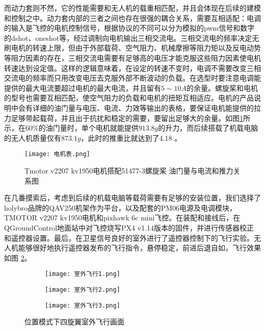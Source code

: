 而动力套则不然，它的性能需要和无人机的载重相匹配，并且会体现在后续的建模和控制之中。动力套内部的三者之间也存在很强的耦合关系，需要互相适配：电调的输入是飞控的电机控制信号，根据协议的不同可以分为模拟的pwm信号和数字的dshot、oneshot等，经过调制向电机输出三相交流电。三相交流电的频率决定无刷电机的转速上限，但由于外部载荷、空气阻力、机械摩擦等阻力矩以及反电动势等阻力因素的存在，三相交流电需要有足够高的电压才能克服这些阻力因素使电机转速达到设定值。这样的逻辑意味着，在设定的转速不变时，电调不需要改变三相交流电的频率而只用改变电压去克服外部不断波动的负载。在选型时要注意电调能提供的最大电流要超过电机的最大电流，并且留有$5\sim 10A$的余量。螺旋桨和电机的型号也需要互相匹配，使空气阻力的负载和电机的扭矩互相适应。电机的产品说明中会有详细的油门量与电压、电流、力效等输出的表格，要保证电机能提供的拉力足够带起载荷，并且出于抗扰和稳定的需要，要留出足够大的余量。如图\ref{电机表}所示，在$60 \%$的油门量时，单个电机就能提供$913.8g$的升力，而后续搭载了机载电脑的无人机质量仅有$873.1g$，此时的推重比就达到了4.18 。
\begin{figure}[!h]
  \centering
  \texttt{[image: 电机表.png]}
  \caption{Tmotor v2207 kv1950电机搭配51477-3螺旋桨 油门量与电流和推力关系图 \cite{Tmotor2023}}
  \label{电机表}
\end{figure}

在几番摸索后，考虑到后续的机载电脑等载荷需要有足够的安装位置，我们选择了holybro品牌的QAV250机架作为平台，以及配套的PM06电源及电调模块，TMOTOR v2207 kv1950电机和pixhawk 6c mini飞控。在装配和接线后，在QGroundControl地面站中对飞控烧写PX4 v1.14版本的固件，并进行传感器校正和遥控器设置。最后，在卫星信号良好的室外进行了遥控器控制下的飞行实验。无人机能够很好地执行遥控器发布的飞行指令，悬停稳定，前进后退自如，飞行效果如图 \ref{室外飞行}。
\begin{figure}[!h]
  \centering
  \begin{subfigure}[c]{0.33\textwidth}
    \centering
    \texttt{[image: 室外飞行1.png]}
  \end{subfigure} \hfill
  \begin{subfigure}[c]{0.33\textwidth}
    \centering
    \texttt{[image: 室外飞行2.png]}
  \end{subfigure}\hfill
    \begin{subfigure}[c]{0.33\textwidth}
      \centering
      \texttt{[image: 室外飞行3.png]}
  \end{subfigure}
  \caption{位置模式下四旋翼室外飞行画面}
  \label{室外飞行}
  \end{figure}

